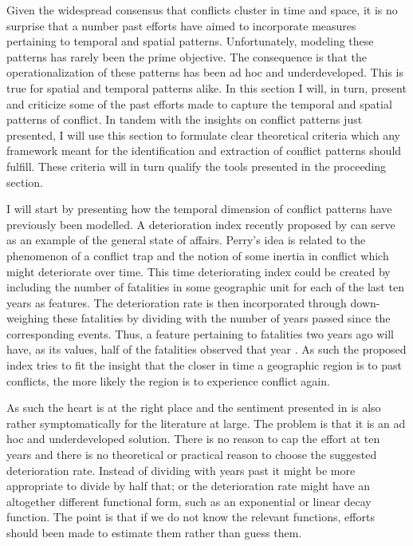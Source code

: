\documentclass[a4paper]{article}
\begin{document}
Given the widespread consensus that conflicts cluster in time and space, it is no surprise that a number past efforts have aimed to incorporate measures pertaining to temporal and spatial patterns. Unfortunately, modeling these patterns has rarely been the prime objective. The consequence is that the operationalization of these patterns has been ad hoc and underdeveloped. This is true for spatial and temporal patterns alike. In this section I will, in turn, present and criticize some of the past efforts made to capture the temporal and spatial patterns of conflict. In tandem with the insights on conflict patterns just presented, I will use this section to formulate clear theoretical criteria which any framework meant for the identification and extraction of conflict patterns should fulfill. These criteria will in turn qualify the tools presented in the proceeding section.\par


I will start by presenting how the temporal dimension of conflict patterns have previously been modelled. A deterioration index recently proposed by \cite{perry_2013} can serve as an example of the general state of affairs. Perry's idea is related to the phenomenon of a conflict trap and the notion of some inertia in conflict which might deteriorate over time. This time deteriorating index could be created by including the number of fatalities in some geographic unit for each of the last ten years as features. The deterioration rate is then incorporated through down-weighing these fatalities by dividing with the number of years passed since the corresponding events. Thus, a feature pertaining to fatalities two years ago will have, as its values, half of the fatalities observed that year \cite[14]{perry_2013}. As such the proposed index tries to fit the insight that the closer in time a geographic region is to past conflicts, the more likely the region is to experience conflict again.\par

As such the heart is at the right place and the sentiment presented in \cite{perry_2013} is also rather symptomatically for the literature at large. The problem is that it is an ad hoc and underdeveloped solution. There is no reason to cap the effort at ten years and there is no theoretical or practical reason to choose the suggested deterioration rate. Instead of dividing with years past it might be more appropriate to divide by half that; or the deterioration rate might have an altogether different functional form, such as an exponential or linear decay function. The point is that if we do not know the relevant functions, efforts should been made to estimate them rather than guess them.\par 
\end{document}
